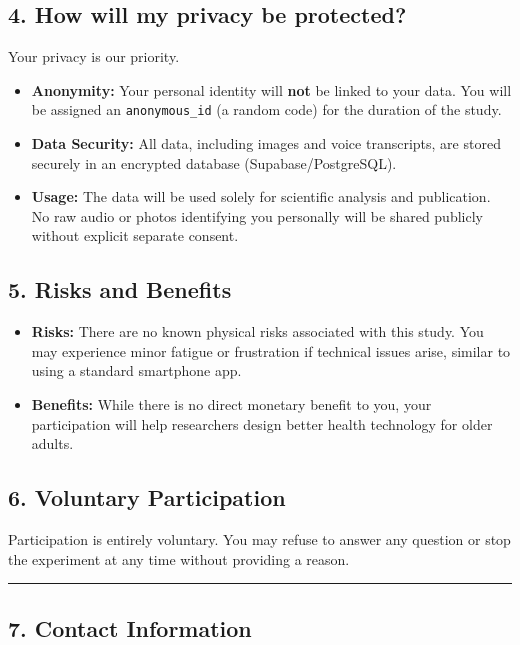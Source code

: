 \subsection*{4. How will my privacy be protected?}

Your privacy is our priority.

\begin{itemize}
    \item \textbf{Anonymity:} Your personal identity will \textbf{not} be linked to your data. You will be assigned an \texttt{anonymous\_id} (a random code) for the duration of the study.
    \item \textbf{Data Security:} All data, including images and voice transcripts, are stored securely in an encrypted database (Supabase/PostgreSQL).
    \item \textbf{Usage:} The data will be used solely for scientific analysis and publication. No raw audio or photos identifying you personally will be shared publicly without explicit separate consent.
\end{itemize}

\subsection*{5. Risks and Benefits}

\begin{itemize}
    \item \textbf{Risks:} There are no known physical risks associated with this study. You may experience minor fatigue or frustration if technical issues arise, similar to using a standard smartphone app.
    \item \textbf{Benefits:} While there is no direct monetary benefit to you, your participation will help researchers design better health technology for older adults.
\end{itemize}

\subsection*{6. Voluntary Participation}

Participation is entirely voluntary. You may refuse to answer any question or stop the experiment at any time without providing a reason.

\vspace{1em}
\hrule
\vspace{1em}

\subsection*{7. Contact Information}

